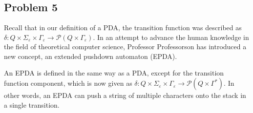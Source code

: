 \documentclass{article}
\begin{document}
\begin{enumerate}[(a)]

\end{enumerate}

\newpage


\subsection*{Problem 5}
    Recall that in our definition of a PDA, the transition function was described as $\delta: Q\times\Sigma_\varepsilon\times\Gamma_\varepsilon\to\mathcal{P}(Q\times\Gamma_\varepsilon)$. In an attempt to advance the human knowledge in the field of theoretical computer science, Professor Professorson has introduced a new concept, an extended pushdown automaton (EPDA).

    An EPDA is defined in the same way as a PDA, except for the transition function component, which is now given as $\delta: Q\times\Sigma_\varepsilon\times\Gamma_\varepsilon\to\mathcal{P}(Q\times\Gamma^*)$. In other words, an EPDA can push a string of multiple characters onto the stack in a single transition. 
\end{document}
